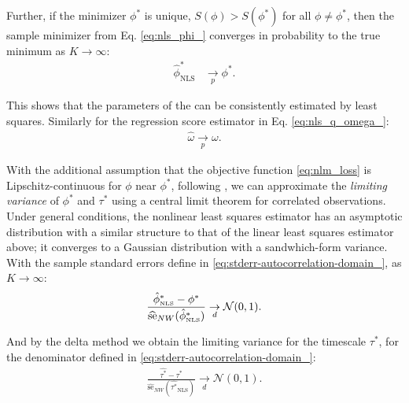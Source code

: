 \documentclass[docs/main.tex]{subfiles}
\begin{document}
\noindent Further, if the minimizer $\phi^*$ is unique, $S(\phi) > S(\phi^*)$ for all $\phi \ne \phi^*$, then the sample minimizer from Eq. \eqref{eq:nls_phi_} converges in probability to the true minimum as $K\to\infty$:
\begin{align}
\hat \phi^*_{\scriptscriptstyle\text{NLS}} &\underset{p}{\to} \phi^*.
\end{align}

\noindent This shows that the parameters of the  can be consistently estimated by least squares. Similarly for the regression score estimator in Eq. \eqref{eq:nls_q_omega_}:
\begin{align}
\hat \omega \underset{p}{\to} \omega.
\end{align}


With the additional assumption that the objective function \eqref{eq:nlm_loss} is Lipschitz-continuous for $\phi$ near $\phi^*$, following \citet[Theorem~23.2]{hansen_econometrics_2022}, we can approximate the \textit{limiting variance} of $\phi^*$ and $\tau^*$ using a central limit theorem for correlated observations. Under general conditions, the nonlinear least squares estimator has an asymptotic distribution with a similar structure to that of the linear least squares estimator above; it converges to a Gaussian distribution with a sandwhich-form variance. With the sample standard errors define in \eqref{eq:stderr-autocorrelation-domain_}, as $K\to\infty$:
\begin{align}
\frac{\hat\phi^*_{\scriptscriptstyle\scriptscriptstyle\text{NLS}} - \phi^*}{\widehat{\text{se}}_{NW}(\hat\phi^*_{\scriptscriptstyle\text{NLS}})} \underset{d}{\to} \mathcal{N}(0, 1). \label{eq:nls-phi-clt}
\end{align}

\noindent And by the delta method we obtain the limiting variance for the timescale $\tau^*$, for the denominator defined in \eqref{eq:stderr-autocorrelation-domain_}:
\begin{align}
\frac{\hat{\tau^*} - \tau^*}{\widehat{\text{se}}_{NW}(\hat{\tau^*}_{\scriptscriptstyle\text{NLS}})} \underset{d}{\to} \mathcal{N}(0,1).
\end{align}
\end{document}
